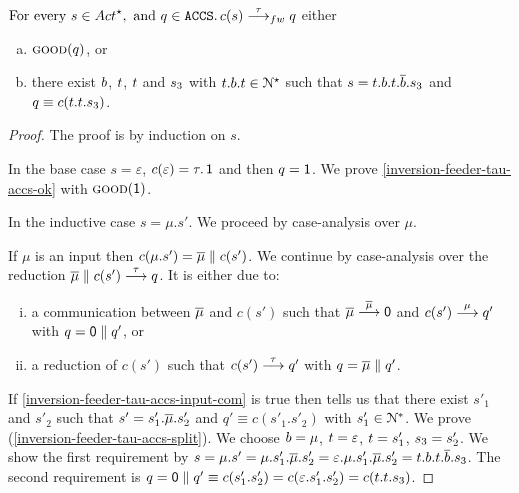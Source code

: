 \begin{lemma}%
  \label{lem:inversion-feeder-tau-accs}
  $\Forevery \trace \in \Actfin, \and q \in \ACCS \suchthat
  c(s) \sta{\tau} q$ either
  \begin{enumerate}[(a)]
  \item\label{inversion-feeder-tau-accs-ok} $\textsc{good}(q)$, or
  \item\label{inversion-feeder-tau-accs-split}
    there exist $b$, $t$, $t$ and $s_3$ with
    $t.b.t \in \mathcal{N}^\star$ such that
    $s = t.b.t.\overline{b}.s_3$ and
    $q \equiv c(t.t.s_3)$.
    \end{enumerate}
\end{lemma}
\begin{proof}
The proof is by induction on $s$.

In the base case $s = \varepsilon$, $c(\varepsilon) = \tau.\mathop{\textsf{1}}$ and then
$q = \mathop{\textsf{1}}$. We prove \ref{inversion-feeder-tau-accs-ok} with $\textsc{good}(\mathop{\textsf{1}})$.

In the inductive case $s = \mu.s'$.
We proceed by case-analysis over $\mu$.

If $\mu$ is an input then $c(\mu.s') = \overline{\mu} \mathrel{\parallel} c(s')$.
We continue by case-analysis over the reduction $\overline{\mu} \mathrel{\parallel} c(s') \mathrel{\overset{\tau}\longrightarrow} q$.
It is either due to:
\begin{enumerate}[(i)]
\item\label{inversion-feeder-tau-accs-input-com}
  a communication between $\overline{\mu}$ and $c(s')$ such that
  $\overline{\mu} \mathrel{\overset{\overline{\mu}}\longrightarrow} \mathop{\textsf{0}}$ and $c(s') \mathrel{\overset{\mu}\longrightarrow} q'$ with $q = \mathop{\textsf{0}} \mathrel{\parallel} q'$, or
\item\label{inversion-feeder-tau-accs-input-tau}
  a reduction of $c(s')$ such that $c(s') \mathrel{\overset{\tau}\longrightarrow} q'$ with $q = \overline{\mu} \mathrel{\parallel} q'$.
\end{enumerate}
If \ref{inversion-feeder-tau-accs-input-com} is true then
 tells us that
there exist $s'_1$ and $s'_2$ such that
$s' = s'_1.\overline{\mu}.s'_2$ and $q' \equiv c(s'_1.s'_2)$ with $s'_1 \in \mathcal{N}^*$.
We prove (\ref{inversion-feeder-tau-accs-split}).
We choose $b = \mu$, $t = \varepsilon$, $t = s'_1$, $s_3 = s'_2$.
We show the first requirement by
$s = \mu.s' = \mu.s'_1.\overline{\mu}.s'_2 = \varepsilon.\mu.s'_1.\overline{\mu}.s'_2 = t.b.t.\overline{b}.s_3$.
The second requirement is $q = \mathop{\textsf{0}} \mathrel{\parallel} q' \equiv c(s'_1.s'_2) = c(\varepsilon.s'_1.s'_2) = c(t.t.s_3)$.


\end{proof}
